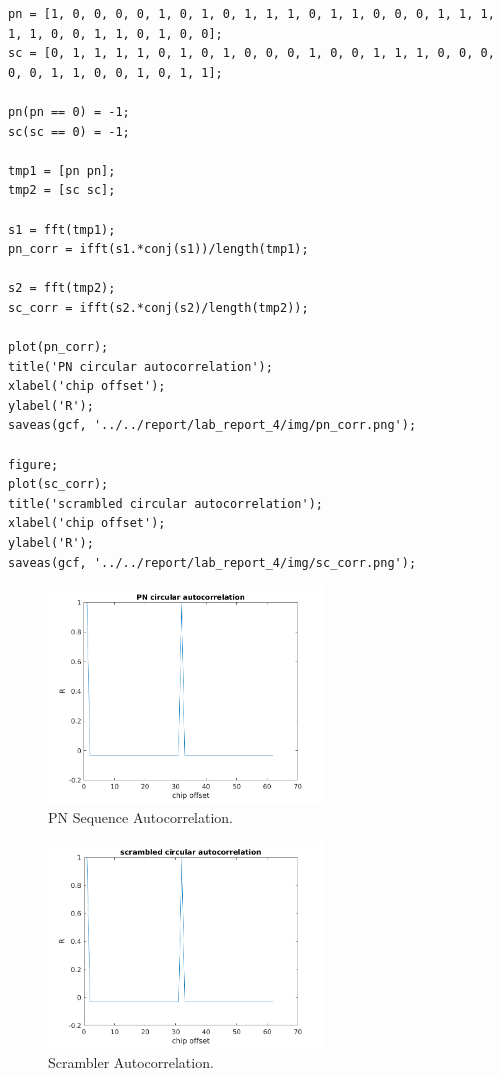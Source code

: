 \documentclass{article}
\begin{document}
\begin{verbatim}
pn = [1, 0, 0, 0, 0, 1, 0, 1, 0, 1, 1, 1, 0, 1, 1, 0, 0, 0, 1, 1, 1, 1, 1, 0, 0, 1, 1, 0, 1, 0, 0];
sc = [0, 1, 1, 1, 1, 0, 1, 0, 1, 0, 0, 0, 1, 0, 0, 1, 1, 1, 0, 0, 0, 0, 0, 1, 1, 0, 0, 1, 0, 1, 1];

pn(pn == 0) = -1;
sc(sc == 0) = -1;

tmp1 = [pn pn];
tmp2 = [sc sc];

s1 = fft(tmp1);
pn_corr = ifft(s1.*conj(s1))/length(tmp1);

s2 = fft(tmp2);
sc_corr = ifft(s2.*conj(s2)/length(tmp2));

plot(pn_corr);
title('PN circular autocorrelation');
xlabel('chip offset');
ylabel('R');
saveas(gcf, '../../report/lab_report_4/img/pn_corr.png');

figure;
plot(sc_corr);
title('scrambled circular autocorrelation');
xlabel('chip offset');
ylabel('R');
saveas(gcf, '../../report/lab_report_4/img/sc_corr.png');
\end{verbatim}

\begin{figure}[h]
  \begin{center}
    \includegraphics[width=0.65\textwidth]{img/pn_corr.png}
    \caption{PN Sequence Autocorrelation.}
  \end{center}
\end{figure}
\begin{figure}[h]
  \begin{center}
    \includegraphics[width=0.65\textwidth]{img/sc_corr.png}
    \caption{Scrambler Autocorrelation.}
  \end{center}
\end{figure}
\end{document}
